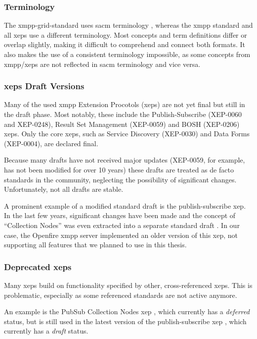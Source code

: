 \subsubsection{Terminology}

The \gls{xmpp-grid-standard} uses \gls{sacm} terminology \cite{ietf-sacm-terminology-14}, whereas the \gls{xmpp} standard and all \glspl{xep} use a different terminology.
Most concepts and term definitions differ or overlap slightly, making it difficult to comprehend and connect both formats.
It also makes the use of a consistent terminology impossible, as some concepts from \gls{xmpp}/\glspl{xep} are not reflected in \gls{sacm} terminology and vice versa.

\subsubsection{\glspl{xep} Draft Versions}
Many of the used \gls{xmpp} Extension Procotols (\glspl{xep}) are not yet final but still in the draft phase.
Most notably, these include the Publish-Subscribe (XEP-0060 and XEP-0248), Result Set Management (XEP-0059) and BOSH (XEP-0206) \glspl{xep}.
Only the core \glspl{xep}, such as Service Discovery (XEP-0030) and Data Forms (XEP-0004), are declared final.

Because many drafts have not received major updates (XEP-0059, for example, has not been modified for over 10 years) these drafts are treated as de facto standards in the community, neglecting the possibility of significant changes.
Unfortunately, not all drafts are stable.

A prominent example of a modified standard draft is the \gls{publish-subscribe} \gls{xep}.
In the last few years, significant changes have been made and the concept of ``Collection Nodes'' was even extracted into a separate standard draft \cite{xep-0248}.
In our case, the Openfire \gls{xmpp} server implemented an older version of this \gls{xep}, not supporting all features that we planned to use in this thesis.

\subsubsection{Deprecated \glspl{xep}}

Many \glspl{xep} build on functionality specified by other, cross-referenced \glspl{xep}.
This is problematic, especially as some referenced standards are not active anymore.

An example is the PubSub Collection Nodes \gls{xep} \cite{xep-0248}, which currently has a \emph{deferred} status, but is still used in the latest version of the \gls{publish-subscribe} \gls{xep} \cite{xep-0060}, which currently has a \emph{draft} status.

